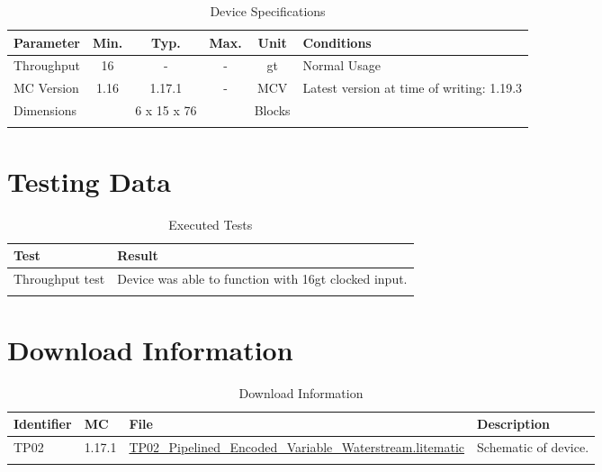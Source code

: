 \documentclass[10pt]{datasheet}
\begin{document}
\begin{table}[h]
    \caption{Device Specifications}
    \begin{tabularx}{\textwidth}{l | c c c | c | X}
        \thickhline
        \textbf{Parameter} & \textbf{Min.} & \textbf{Typ.} & \textbf{Max.} &
        \textbf{Unit} & \textbf{Conditions} \\
        \hline
        Throughput  & 16 & - & - & gt & Normal Usage \\
        \hline
        MC Version & 1.16 & 1.17.1 & - & MCV & Latest version at time of writing: 1.19.3\\
        \hline
        Dimensions & & 6 x 15 x 76 & & Blocks & \\
        \thickhline
\end{tabularx}
\end{table}

\section{Testing Data}

\begin{table}[h]
\caption{Executed Tests}
\begin{tabularx}{\textwidth}{l | X}
    \thickhline
    \textbf{Test} & \textbf{Result} \\
    \hline
    Throughput test & Device was able to function with 16gt clocked input. \\
    \thickhline
\end{tabularx}
\end{table}

\section{Download Information}
\begin{table}[h]
    \caption{Download Information}
    \begin{tabularx}{\textwidth}{l | l | l | X}
        \thickhline
        \textbf{Identifier} & \textbf{MC} & \textbf{File} & \textbf{Description} \\
        \hline
        TP02 & 1.17.1 & \href{https://github.com/Soontech-Annals/Archive/blob/364bde8dbcbc2e5337489ff435bcda9b387017e2/Archive/transport/TP02\%20Pipelined\%20Encoded\%20Variable\%20Waterstream/TP02\_Pipelined\_Encoded\_Variable\_Waterstream.litematic?raw=1}{TP02\_Pipelined\_Encoded\_Variable\_Waterstream.litematic} & Schematic of device. \\
        \hline
        \thickhline
    \end{tabularx}
\end{table}
\end{document}
